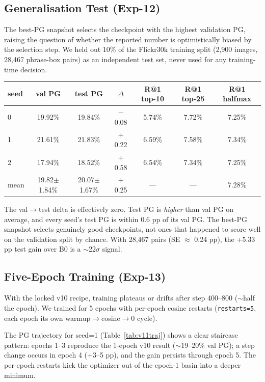 \documentclass{article}
\begin{document}
\subsection{Generalisation Test (Exp-12)}
\label{sec:gentest}

The best-PG snapshot selects the checkpoint with the highest validation PG,
raising the question of whether the reported number is optimistically biased by
the selection step. We held out 10\% of the Flickr30k training split (2,900
images, 28,467 phrase-box pairs) as an independent test set, never used for
any training-time decision.

\begin{center}
\begin{tabular}{lcccccc}
\toprule
seed & val PG & test PG & $\Delta$ & R@1 top-10 & R@1 top-25 & R@1 halfmax \\
\midrule
0 & 19.92\% & 19.84\% & $-$0.08 & 5.74\% & 7.72\% & 7.25\% \\
1 & 21.61\% & 21.83\% & $+$0.22 & 6.59\% & 7.58\% & 7.34\% \\
2 & 17.94\% & 18.52\% & $+$0.58 & 6.54\% & 7.34\% & 7.25\% \\
\midrule
mean & 19.82$\pm$1.84\% & 20.07$\pm$1.67\% & $+$0.25 & --- & --- & 7.28\% \\
\bottomrule
\end{tabular}
\end{center}

The val$\to$test delta is effectively zero. Test PG is \emph{higher} than val
PG on average, and every seed's test PG is within 0.6 pp of its val PG. The
best-PG snapshot selects genuinely good checkpoints, not ones that happened to
score well on the validation split by chance. With 28,467 pairs (SE $\approx$
0.24 pp), the +5.33 pp test gain over B0 is a $\sim$22$\sigma$ signal.

\subsection{Five-Epoch Training (Exp-13)}
\label{sec:5ep}

With the locked v10 recipe, training plateaus or drifts after step 400--800
($\sim$half the epoch). We trained for 5 epochs with per-epoch cosine restarts
(\texttt{restarts=5}, each epoch its own warmup$\to$cosine$\to$0 cycle).

The PG trajectory for seed=1 (Table~\ref{tab:v11traj}) shows a clear
staircase pattern: epochs 1--3 reproduce the 1-epoch v10 result ($\sim$19--20\%
val PG); a step change occurs in epoch 4 ($+$3--5 pp), and the gain persists
through epoch 5. The per-epoch restarts kick the optimizer out of the epoch-1
basin into a deeper minimum.
\end{document}
